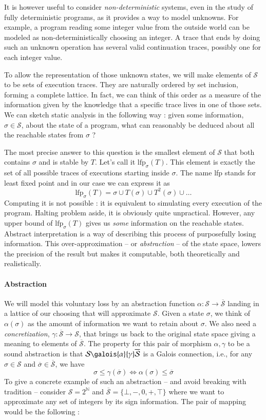 \documentclass[14pt]{article}
\renewcommand{\S}{\mathcal{S}}
\newcommand{\oS}{\overline{\mathcal{S}}}
\newcommand{\lfp}{\text{lfp}}
\begin{document}
It is however useful to consider \emph{non-deterministic} systems, even in the study of fully deterministic programs, as it provides a way to model unknowns. For example, a program reading some integer value from the outside world can be modeled as non-deterministically choosing an integer. A trace that ends by doing such an unknown operation has several valid continuation traces, possibly one for each integer value.

To allow the representation of those unknown states, we will make elements of $\S$ to be sets of execution traces. They are naturally ordered by set inclusion, forming a complete lattice.
In fact, we can think of this order as a measure of the information given by the knowledge that a specific trace lives in one of those sets.
We can sketch static analysis in the following way : given some information, $\sigma\in\S$, about the state of a program, what can reasonably be deduced about
all the reachable states from $\sigma$ ?

The most precise answer to this question is the smallest element of $\S$ that both contains $\sigma$ and is stable by $T$. Let's call it $\lfp_\sigma(T)$. This element is exactly the set of all possible traces of executions starting inside $\sigma$. The name lfp stands for least fixed point and in our case we can express it as 
\[ \text{lfp}_\sigma(T) = \sigma \cup T(\sigma) \cup T^2(\sigma) \cup \dots \]
Computing it is not possible : it is equivalent to simulating every execution of the program. Halting problem aside, it is obviously quite unpractical. However, any upper bound of $\lfp_\sigma(T)$ gives us \emph{some} information on the reachable states. Abstract interpretation is a way of describing this process of purposefully losing information. This over-approximation -- or \emph{abstraction} -- of the state space, lowers the precision of the result but makes it computable, both theoretically and realistically.

\paragraph{Abstraction} We will model this voluntary loss by an abstraction function $\alpha:\S\to\oS$ landing in a lattice of our choosing that will approximate $\S$. Given a state $\sigma$, we think of $\alpha(\sigma)$ as the amount of information we want to retain about $\sigma$. We also need a \emph{concretization}, $\gamma:\oS\to\S$, that brings us back to the original state space giving a meaning to elements of $\oS$. The property for this pair of morphism $\alpha,\gamma$ to be a sound abstraction is that $\S\galois{\alpha}{\gamma}\oS$ is a Galois connection, i.e., for any $\sigma\in\S$ and $\overline{\sigma}\in\oS$, we have
\[ \sigma \leq \gamma(\overline{\sigma}) \iff \alpha(\sigma) \leq \overline{\sigma} \]
To give a concrete example of such an abstraction -- and avoid breaking with tradition -- consider $\S = 2^{\mathbb{N}}$ and $\oS = \{\bot,-,0,+,\top\}$ where we want to approximate any set of integers by its sign information. The pair of mapping would be the following :
\end{document}
